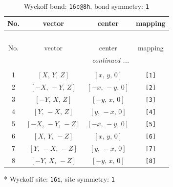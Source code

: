 \documentclass[fleqn,8pt]{jsarticle}
\begin{document}
\renewcommand{\arraystretch}{1.2}
\begin{longtable}{cccc}
\caption{Wyckoff bond: {\tt 16c@8h}, bond symmetry: {\tt 1}}
 \\
 \hline \hline
No. & vector & center & mapping \\ \hline \endfirsthead

\multicolumn{3}{l}{\tablename\ \thetable{}} \\
 \hline \hline
No. & vector & center & mapping \\ \hline \endhead

 \hline \hline
\multicolumn{3}{r}{\footnotesize\it continued ...} \\ \endfoot

 \hline \hline
\multicolumn{3}{r}{} \\ \endlastfoot

1 & $\left[ X,\, Y,\, Z \right]$ & $\left[ x,\, y,\, 0 \right]$ & {\tt [1]} \\ \hline
2 & $\left[ - X,\, - Y,\, Z \right]$ & $\left[ - x,\, - y,\, 0 \right]$ & {\tt [2]} \\ \hline
3 & $\left[ - Y,\, X,\, Z \right]$ & $\left[ - y,\, x,\, 0 \right]$ & {\tt [3]} \\ \hline
4 & $\left[ Y,\, - X,\, Z \right]$ & $\left[ y,\, - x,\, 0 \right]$ & {\tt [4]} \\ \hline
5 & $\left[ - X,\, - Y,\, - Z \right]$ & $\left[ - x,\, - y,\, 0 \right]$ & {\tt [5]} \\ \hline
6 & $\left[ X,\, Y,\, - Z \right]$ & $\left[ x,\, y,\, 0 \right]$ & {\tt [6]} \\ \hline
7 & $\left[ Y,\, - X,\, - Z \right]$ & $\left[ y,\, - x,\, 0 \right]$ & {\tt [7]} \\ \hline
8 & $\left[ - Y,\, X,\, - Z \right]$ & $\left[ - y,\, x,\, 0 \right]$ & {\tt [8]} \\
\end{longtable}
* Wyckoff site: {\tt 16i}, site symmetry: {\tt 1}
\renewcommand{\arraystretch}{1.2}
\end{document}
